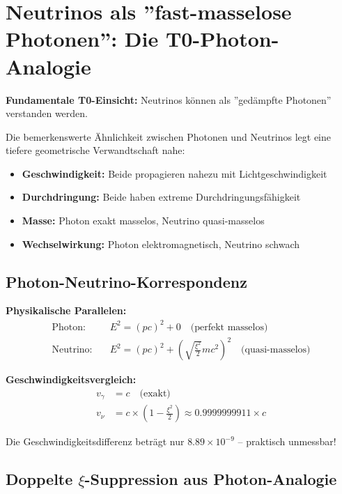 \documentclass[12pt,a4paper]{article}
\newcommand{\xipar}{\xi}
\begin{document}
	\section{Neutrinos als ''fast-masselose Photonen'': Die T0-Photon-Analogie}
	
	\begin{speculation}
		\textbf{Fundamentale T0-Einsicht:} Neutrinos können als ''gedämpfte Photonen'' verstanden werden.
		
		Die bemerkenswerte Ähnlichkeit zwischen Photonen und Neutrinos legt eine tiefere geometrische Verwandtschaft nahe:
		\begin{itemize}
			\item \textbf{Geschwindigkeit:} Beide propagieren nahezu mit Lichtgeschwindigkeit
			\item \textbf{Durchdringung:} Beide haben extreme Durchdringungsfähigkeit
			\item \textbf{Masse:} Photon exakt masselos, Neutrino quasi-masselos
			\item \textbf{Wechselwirkung:} Photon elektromagnetisch, Neutrino schwach
		\end{itemize}
	\end{speculation}
	
	\subsection{Photon-Neutrino-Korrespondenz}
	
	\begin{important}
		\textbf{Physikalische Parallelen:}
		\begin{align}
			\text{Photon:} \quad &E^2 = (pc)^2 + 0 \quad \text{(perfekt masselos)} \\
			\text{Neutrino:} \quad &E^2 = (pc)^2 + \left(\sqrt{\frac{\xipar^2}{2}} m c^2\right)^2 \quad \text{(quasi-masselos)}
		\end{align}
		
		\textbf{Geschwindigkeitsvergleich:}
		\begin{align}
			v_\gamma &= c \quad \text{(exakt)} \\
			v_\nu &= c \times \left(1 - \frac{\xipar^2}{2}\right) \approx 0.9999999911 \times c
		\end{align}
		
		Die Geschwindigkeitsdifferenz beträgt nur \(8.89 \times 10^{-9}\) -- praktisch unmessbar!
	\end{important}
	
	\subsection{Doppelte \(\xipar\)-Suppression aus Photon-Analogie}
	
\end{document}
